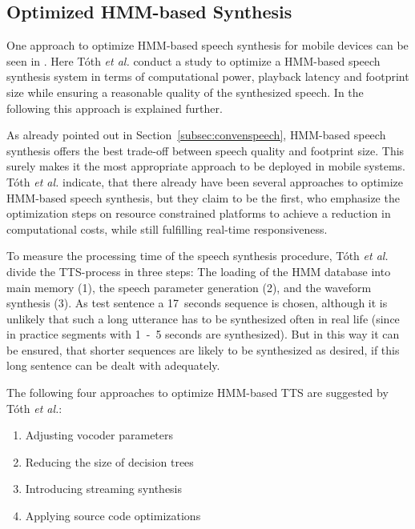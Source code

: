 \subsection{Optimized \ac{HMM}-based Synthesis}
\label{subsec:hmmembedded}

One approach to optimize \ac{HMM}-based speech synthesis for mobile devices can be seen in \cite{toth:optimizing}. Here T\'oth \textit{et al.} conduct a study to optimize a \ac{HMM}-based speech synthesis system in terms of computational power, playback latency and footprint size while ensuring a reasonable quality of the synthesized speech. In the following this approach is explained further.

As already pointed out in Section~\ref{subsec:convenspeech}, \ac{HMM}-based speech synthesis offers the best trade-off between speech quality and footprint size. This surely makes it the most appropriate approach to be deployed in mobile systems. T\'oth \textit{et al.} indicate, that there already have been several approaches to optimize \ac{HMM}-based speech synthesis, but they claim to be the first, who emphasize the optimization steps on resource constrained platforms to achieve a reduction in computational costs, while still fulfilling real-time responsiveness.

To measure the processing time of the speech synthesis procedure, T\'oth \textit{et al.} divide the \ac{TTS}-process in three steps: The loading of the \ac{HMM} database
into main memory (1), the speech parameter generation (2), and the waveform synthesis (3). As test sentence a 17~seconds sequence is chosen, although it is unlikely that such a long utterance has to be synthesized often in real life (since in practice segments with 1~-~5 seconds are synthesized). But in this way it can be ensured, that shorter sequences are likely to be synthesized as desired, if this long sentence can be dealt with adequately.

The following four approaches to optimize \ac{HMM}-based \ac{TTS} are suggested by T\'oth \textit{et al.}:

\begin{enumerate}[label=\Alph*)]		%
	\parskip0.25em
	\bfseries
	\item Adjusting vocoder parameters
	\item Reducing the size of decision trees
	\item Introducing streaming synthesis
	\item Applying source code optimizations
\end{enumerate}

